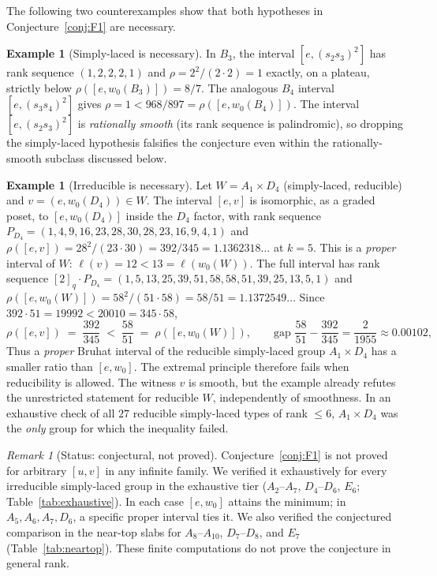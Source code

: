 \documentclass[11pt]{amsart}
\theoremstyle{plain}
\theoremstyle{definition}
\newtheorem{example}[theorem]{Example}
\theoremstyle{remark}
\newtheorem{remark}[theorem]{Remark}
\newcommand{\W}{W}
\begin{document}
The following two counterexamples show that both hypotheses in
Conjecture~\ref{conj:F1} are necessary.

\begin{example}[Simply-laced is necessary]
\label{ex:F1-simplylaced}
In $B_3$, the interval $[e,(s_2s_3)^2]$ has rank sequence $(1,2,2,2,1)$ and
$\rho=2^2/(2\cdot2)=1$ exactly, on a plateau, strictly below
$\rho([e,w_0(B_3)])=8/7$. The analogous $B_4$ interval
$[e,(s_3s_4)^2]$ gives $\rho=1<968/897=\rho([e,w_0(B_4)])$. The interval $[e,(s_2s_3)^2]$ is \emph{rationally smooth} (its rank
sequence is palindromic), so dropping the simply-laced hypothesis
falsifies the conjecture even within the rationally-smooth subclass
discussed below.
\end{example}

\begin{example}[Irreducible is necessary]
\label{ex:F1-irreducible}
Let $\W=A_1\times D_4$ (simply-laced, reducible) and $v=(e,w_0(D_4))\in\W$.
The interval $[e,v]$ is isomorphic, as a graded poset, to $[e,w_0(D_4)]$
inside the $D_4$ factor, with rank sequence $P_{D_4}=
(1,4,9,16,23,28,30,28,23,16,9,4,1)$ and
$\rho([e,v])=28^2/(23\cdot30)=392/345=1.1362318\ldots$ at $k=5$. This is a
\emph{proper} interval of $\W$: $\ell(v)=12<13=\ell(w_0(\W))$. The full
interval has rank sequence $[2]_q\cdot P_{D_4}=
(1,5,13,25,39,51,58,58,51,39,25,13,5,1)$ and
$\rho([e,w_0(\W)])=58^2/(51\cdot58)=58/51=1.1372549\ldots$ Since
$392\cdot51=19992<20010=345\cdot58$,
\[
\rho([e,v]) \;=\; \frac{392}{345} \;<\; \frac{58}{51} \;=\; \rho([e,w_0(\W)]),
\qquad \text{gap } \frac{58}{51}-\frac{392}{345}=\frac{2}{1955}\approx0.00102,
\]
Thus a \emph{proper} Bruhat interval of the reducible simply-laced group
$A_1\times D_4$ has a smaller ratio than $[e,w_0]$. The extremal principle
therefore fails when reducibility is allowed. The witness $v$ is smooth,
but the example already refutes the unrestricted statement for reducible
$\W$, independently of smoothness. In an exhaustive check of all $27$
reducible simply-laced types of rank $\le 6$, $A_1\times D_4$ was the
\emph{only} group for which the inequality failed.
\end{example}

\begin{remark}[Status: conjectural, not proved]
Conjecture~\ref{conj:F1} is not proved for arbitrary $[u,v]$ in any
infinite family. We verified it exhaustively for every irreducible
simply-laced group in the exhaustive tier
($A_2$--$A_7$, $D_4$--$D_6$, $E_6$;
Table~\ref{tab:exhaustive}). In each case $[e,w_0]$ attains the minimum;
in $A_5,A_6,A_7,D_6$, a specific proper interval ties it. We also verified
the conjectured comparison in the near-top slabs for
$A_8$--$A_{10}$, $D_7$--$D_8$, and $E_7$
(Table~\ref{tab:neartop}). These finite computations do not prove the
conjecture in general rank.
\end{remark}
\end{document}
